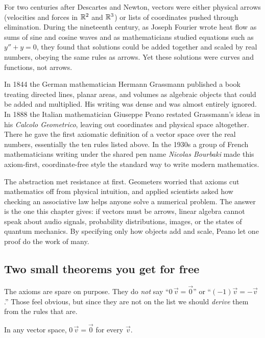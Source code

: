 \begin{historybox}
For two centuries after Descartes and Newton, vectors were either physical arrows (velocities and forces in $\mathbb{R}^2$ and $\mathbb{R}^3$) or lists of coordinates pushed through elimination. During the nineteenth century, as Joseph Fourier wrote heat flow as sums of sine and cosine waves and as mathematicians studied equations such as $y'' + y = 0$, they found that solutions could be added together and scaled by real numbers, obeying the same rules as arrows. Yet these solutions were curves and functions, not arrows.

In 1844 the German mathematician Hermann Grassmann published a book treating directed lines, planar areas, and volumes as algebraic objects that could be added and multiplied. His writing was dense and was almost entirely ignored. In 1888 the Italian mathematician Giuseppe Peano restated Grassmann's ideas in his \emph{Calcolo Geometrico}, leaving out coordinates and physical space altogether. There he gave the first axiomatic definition of a vector space over the real numbers, essentially the ten rules listed above. In the 1930s a group of French mathematicians writing under the shared pen name \emph{Nicolas Bourbaki} made this axiom-first, coordinate-free style the standard way to write modern mathematics.

The abstraction met resistance at first. Geometers worried that axioms cut mathematics off from physical intuition, and applied scientists asked how checking an associative law helps anyone solve a numerical problem. The answer is the one this chapter gives: if vectors must be arrows, linear algebra cannot speak about audio signals, probability distributions, images, or the states of quantum mechanics. By specifying only how objects add and scale, Peano let one proof do the work of many.
\end{historybox}

\subsection{Two small theorems you get for free}

The axioms are spare on purpose. They do \emph{not} say ``$0\,\vec{v} = \vec{0}$''
or ``$(-1)\vec{v} = -\vec{v}$.'' Those feel obvious, but since they are not on the list we
should \emph{derive} them from the rules that are.

\begin{proposition}\label{ch11:zero-scalar}
In any vector space, $0\,\vec{v} = \vec{0}$ for every $\vec{v}$.
\end{proposition}

